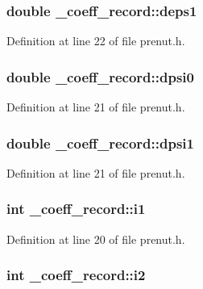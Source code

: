 \subsubsection[{deps1}]{\setlength{\rightskip}{0pt plus 5cm}double {\bf \-\_\-coeff\-\_\-record\-::deps1}}\label{struct__coeff__record_a6df09506dc331fb0af93719e691302b1}


\-Definition at line 22 of file prenut.\-h.

\subsubsection[{dpsi0}]{\setlength{\rightskip}{0pt plus 5cm}double {\bf \-\_\-coeff\-\_\-record\-::dpsi0}}\label{struct__coeff__record_ad7e3d2d5e8de00f3e69f714ab6e2f61d}


\-Definition at line 21 of file prenut.\-h.

\subsubsection[{dpsi1}]{\setlength{\rightskip}{0pt plus 5cm}double {\bf \-\_\-coeff\-\_\-record\-::dpsi1}}\label{struct__coeff__record_aaafae4c1b337d1a5f6a5248609e65645}


\-Definition at line 21 of file prenut.\-h.

\subsubsection[{i1}]{\setlength{\rightskip}{0pt plus 5cm}int {\bf \-\_\-coeff\-\_\-record\-::i1}}\label{struct__coeff__record_af26f8195abb73cea1b054aacf38781bc}


\-Definition at line 20 of file prenut.\-h.

\subsubsection[{i2}]{\setlength{\rightskip}{0pt plus 5cm}int {\bf \-\_\-coeff\-\_\-record\-::i2}}\label{struct__coeff__record_a9d3db03a7779e46f8afb83afc62538e8}


